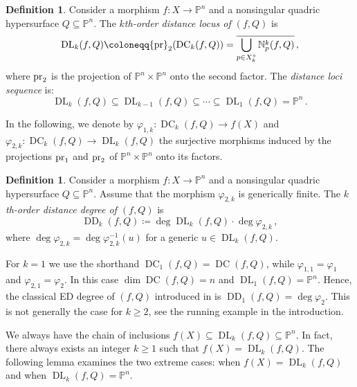 \documentclass[11pt,reqno]{amsart}
\numberwithin{equation}{section}
\theoremstyle{plain}
\numberwithin{theorem}{section}
\theoremstyle{definition}
\newtheorem{definition}[theorem]{Definition}
\newcommand{\N}{\mathbb{N}}
\renewcommand{\P}{\mathbb{P}}
\newcommand{\pr}{{\rm pr}}
\newcommand{\DC}{\operatorname{DC}}
\newcommand{\DL}{\operatorname{DL}}
\newcommand{\DD}{\operatorname{DD}}
\begin{document}
\begin{definition}\label{def: distance locus}
Consider a morphism $f\colon X\to\P^n$ and a nonsingular quadric hypersurface $Q\subseteq\P^n$. The {\em $k$th-order distance locus of $(f,Q)$} is
\begin{equation}\label{eq: def distance locus}
\DL_k(f,Q)\coloneqq\pr_2(\DC_k(f,Q)) = \overline{ \bigcup_{p \in X_k^{\circ}} \N_p^k(f,Q)}\,,
\end{equation}
where $\pr_2$ is the projection of $\P^n\times\P^n$ onto the second factor. The {\em distance loci sequence} is:
\[
\DL_k(f,Q)\subseteq \DL_{k-1}(f,Q)\subseteq\cdots\subseteq \DL_1(f,Q)=\P^n\,.
\]
\end{definition}

In the following, we denote by $\varphi_{1,k}\colon\DC_k(f,Q)\to f(X)$ and $\varphi_{2,k}\colon\DC_k(f,Q)\to\DL_k(f,Q)$ the surjective morphisms induced by the projections $\pr_1$ and $\pr_2$ of $\P^n\times\P^n$ onto its factors.

\begin{definition}\label{def: kth order ED degree}
Consider a morphism $f\colon X\to\P^n$ and a nonsingular quadric hypersurface $Q\subseteq\P^n$. Assume that the morphism $\varphi_{2,k}$ is generically finite. The {\em $k$th-order distance degree of $(f,Q)$} is
\[
\DD_k(f,Q)\coloneqq\deg\DL_k(f,Q)\cdot\deg\varphi_{2,k}\,,
\]
where $\deg\varphi_{2,k}=\deg\varphi_{2,k}^{-1}(u)$ for a generic $u\in\DL_k(f,Q)$.
\end{definition}

For $k=1$ we use the shorthand $\DC_1(f,Q)=\DC(f,Q)$, while $\varphi_{1,1}=\varphi_1$ and $\varphi_{2,1}=\varphi_2$. In this case $\dim\DC(f,Q)=n$ and $\DL_1(f,Q)=\P^n$. 
Hence, the classical ED degree of $(f,Q)$ introduced in \cite{DHOST} is $\DD_1(f,Q)=\deg\varphi_2$. This is not generally the case for $k\ge 2$, see the running example in the introduction.

We always have the chain of inclusions $f(X)\subseteq \DL_k(f,Q)\subseteq\P^n.$ In fact, there always exists an integer $k\ge 1$ such that $f(X)=\DL_k(f,Q).$ The following lemma examines the two extreme cases: when $f(X)=\DL_k(f,Q)$ and when $\DL_k(f,Q)=\P^n.$
\end{document}
